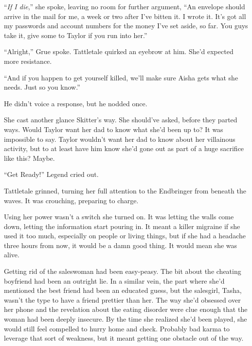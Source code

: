 ``\emph{If I die},'' she spoke, leaving no room for further argument, ``An envelope should arrive in the mail for me, a week or two after I've bitten it.  I wrote it.  It's got all my passwords and account numbers for the money I've set aside, so far.  You guys take it, give some to Taylor if you run into her.''



``Alright,'' Grue spoke.  Tattletale quirked an eyebrow at him.  She'd expected more resistance.



``And if you happen to get yourself killed, we'll make sure Aisha gets what she needs.  Just so you know.''



He didn't voice a response, but he nodded once.



She cast another glance Skitter's way.  She should've asked, before they parted ways.  Would Taylor want her dad to know what she'd been up to?  It was impossible to say.  Taylor wouldn't want her dad to know about her villainous activity, but to at least have him know she'd gone out as part of a huge sacrifice like this?  Maybe.



``Get Ready!'' Legend cried out.



Tattletale grinned, turning her full attention to the Endbringer from beneath the waves.  It was crouching, preparing to charge.



Using her power wasn't a switch she turned on.  It was letting the walls come down, letting the information start pouring in.  It meant a killer migraine if she used it too much, especially on people or living things, but if she had a headache three hours from now, it would be a damn good thing.  It would mean she was alive.



\sectionbreak



Getting rid of the saleswoman had been easy-peasy.  The bit about the cheating boyfriend had been an outright lie.  In a similar vein, the part where she'd mentioned the best friend had been an educated guess, but the salesgirl, Tasha, wasn't the type to have a friend prettier than her.   The way she'd obsessed over her phone and the revelation about the eating disorder were clue enough that the woman had been deeply insecure.  By the time she realized she'd been played, she would still feel compelled to hurry home and check.  Probably bad karma to leverage that sort of weakness, but it meant getting one obstacle out of the way.



